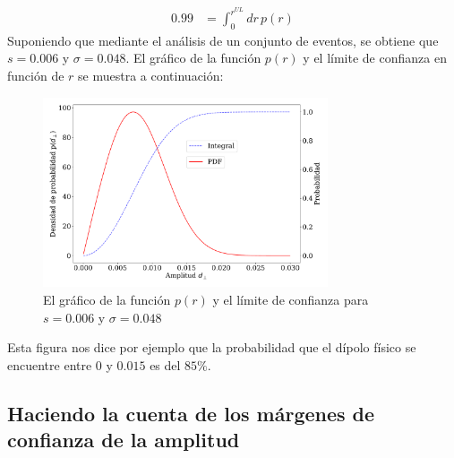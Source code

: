 \begin{align}
    0.99 &= \int_{0}^{r^{UL}} dr \, p(r)
    \label{ec:r_upper_limit}
\end{align} 
Suponiendo que mediante el análisis de un conjunto de eventos, se obtiene que $s=0.006$ y $\sigma=0.048$. El gráfico de la función $p(r)$ y el límite de confianza en función de $r$ se muestra a continuación:

\begin{figure}[H]
    \begin{small}
        \begin{center}
            \includegraphics[width=0.75\textwidth]{bessel_prob.pdf}
        \end{center}
        \caption{El gráfico de la función $p(r)$ y el límite de confianza para $s=0.006$ y $\sigma=0.048$ }
    \end{small}
\end{figure}

Esta figura nos dice por ejemplo que la probabilidad que el dípolo físico se encuentre entre $0$ y $0.015$ es del $85\%$.

\subsection{Haciendo la cuenta de los márgenes de confianza de la amplitud}

